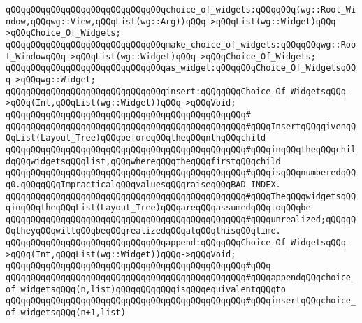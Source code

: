 \newline
\verb|qQQqqQQqqQQqqQQqqQQqqQQqqQQqqQQqchoice_of_widgets:qQQqqQQq(wg::Root_Window,qQQqwg::View,qQQqList(wg::Arg))qQQq->qQQqList(wg::Widget)qQQq->qQQqChoice_Of_Widgets;|\newline
\newline
\verb|qQQqqQQqqQQqqQQqqQQqqQQqqQQqqQQqmake_choice_of_widgets:qQQqqQQqwg::Root_WindowqQQq->qQQqList(wg::Widget)qQQq->qQQqChoice_Of_Widgets;|\newline
\newline
\verb|qQQqqQQqqQQqqQQqqQQqqQQqqQQqqQQqas_widget:qQQqqQQqChoice_Of_WidgetsqQQq->qQQqwg::Widget;|\newline
\newline
\verb|qQQqqQQqqQQqqQQqqQQqqQQqqQQqqQQqinsert:qQQqqQQqChoice_Of_WidgetsqQQq->qQQq(Int,qQQqList(wg::Widget))qQQq->qQQqVoid;|\newline
\verb|qQQqqQQqqQQqqQQqqQQqqQQqqQQqqQQqqQQqqQQqqQQqqQQq#|\newline
\verb|qQQqqQQqqQQqqQQqqQQqqQQqqQQqqQQqqQQqqQQqqQQqqQQq#qQQqInsertqQQqgivenqQQqList(Layout_Tree)qQQqbeforeqQQqtheqQQqnthqQQqchild|\newline
\verb|qQQqqQQqqQQqqQQqqQQqqQQqqQQqqQQqqQQqqQQqqQQqqQQq#qQQqinqQQqtheqQQqchildqQQqwidgetsqQQqlist,qQQqwhereqQQqtheqQQqfirstqQQqchild|\newline
\verb|qQQqqQQqqQQqqQQqqQQqqQQqqQQqqQQqqQQqqQQqqQQqqQQq#qQQqisqQQqnumberedqQQq0.qQQqqQQqImpracticalqQQqvaluesqQQqraiseqQQqBAD_INDEX.|\newline
\verb|qQQqqQQqqQQqqQQqqQQqqQQqqQQqqQQqqQQqqQQqqQQqqQQq#qQQqTheqQQqwidgetsqQQqinqQQqtheqQQqList(Layout_Tree)qQQqareqQQqassumedqQQqtoqQQqbe|\newline
\verb|qQQqqQQqqQQqqQQqqQQqqQQqqQQqqQQqqQQqqQQqqQQqqQQq#qQQqunrealized;qQQqqQQqtheyqQQqwillqQQqbeqQQqrealizedqQQqatqQQqthisqQQqtime.|\newline
\newline
\verb|qQQqqQQqqQQqqQQqqQQqqQQqqQQqqQQqappend:qQQqqQQqChoice_Of_WidgetsqQQq->qQQq(Int,qQQqList(wg::Widget))qQQq->qQQqVoid;|\newline
\verb|qQQqqQQqqQQqqQQqqQQqqQQqqQQqqQQqqQQqqQQqqQQqqQQq#qQQq|\newline
\verb|qQQqqQQqqQQqqQQqqQQqqQQqqQQqqQQqqQQqqQQqqQQqqQQq#qQQqappendqQQqchoice_of_widgetsqQQq(n,list)qQQqqQQqqQQqisqQQqequivalentqQQqto|\newline
\verb|qQQqqQQqqQQqqQQqqQQqqQQqqQQqqQQqqQQqqQQqqQQqqQQq#qQQqinsertqQQqchoice_of_widgetsqQQq(n+1,list)|\newline
\newline
